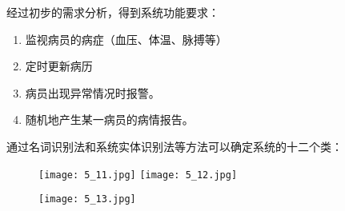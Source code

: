 \documentclass[../main.tex]{subfiles}
\begin{document}
经过初步的需求分析，得到系统功能要求：
\begin{enumerate}
  \item 监视病员的病症（血压、体温、脉搏等）
  \item 定时更新病历
  \item 病员出现异常情况时报警。
  \item 随机地产生某一病员的病情报告。
\end{enumerate}
通过名词识别法和系统实体识别法等方法可以确定系统的十二个类：
\begin{figure}[H]
    \texttt{[image: 5\_11.jpg]}
    \texttt{[image: 5\_12.jpg]}
\end{figure}
\begin{figure}[H]
    \texttt{[image: 5\_13.jpg]}
\end{figure}
\end{document}

